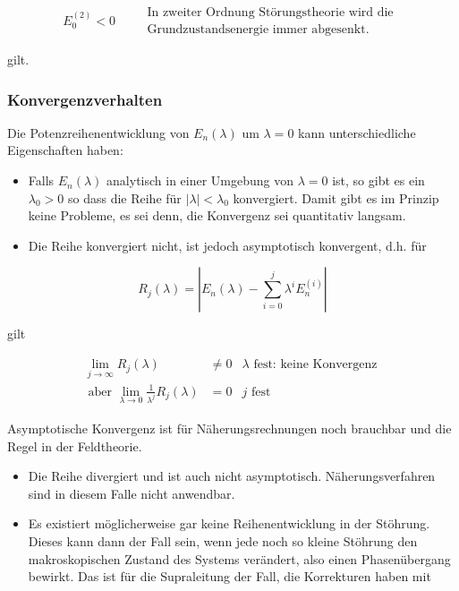 \documentclass[10pt, letterpaper]{article}
\begin{document}
$$
E_{0}^{(2)}<0 \quad \begin{aligned}
& \text { In zweiter Ordnung Störungstheorie wird die } \\
& \text { Grundzustandsenergie immer abgesenkt. }
\end{aligned}
$$

gilt.

\subsubsection*{Konvergenzverhalten}
Die Potenzreihenentwicklung von $E_{n}(\lambda)$ um $\lambda=0$ kann unterschiedliche Eigenschaften haben:

\begin{itemize}
  \item Falls $E_{n}(\lambda)$ analytisch in einer Umgebung von $\lambda=0$ ist, so gibt es ein $\lambda_{0}>0$ so dass die Reihe für $|\lambda|<\lambda_{0}$ konvergiert. Damit gibt es im Prinzip keine Probleme, es sei denn, die Konvergenz sei quantitativ langsam.
  \item Die Reihe konvergiert nicht, ist jedoch asymptotisch konvergent, d.h. für
\end{itemize}

$$
R_{j}(\lambda)=\left|E_{n}(\lambda)-\sum_{i=0}^{j} \lambda^{i} E_{n}^{(i)}\right|
$$

gilt

$$
\begin{array}{rlrl}
\lim _{j \rightarrow \infty} R_{j}(\lambda) & \neq 0 & \lambda \text { fest: keine Konvergenz } \\
\text { aber } \lim _{\lambda \rightarrow 0} \frac{1}{\lambda^{j}} R_{j}(\lambda) & =0 & j \text { fest }
\end{array}
$$

Asymptotische Konvergenz ist für Näherungsrechnungen noch brauchbar und die Regel in der Feldtheorie.

\begin{itemize}
  \item Die Reihe divergiert und ist auch nicht asymptotisch. Näherungsverfahren sind in diesem Falle nicht anwendbar.
  \item Es existiert möglicherweise gar keine Reihenentwicklung in der Stöhrung. Dieses kann dann der Fall sein, wenn jede noch so kleine Stöhrung den makroskopischen Zustand des Systems verändert, also einen Phasenübergang bewirkt. Das ist für die Supraleitung der Fall, die Korrekturen haben mit
\end{itemize}
\end{document}

